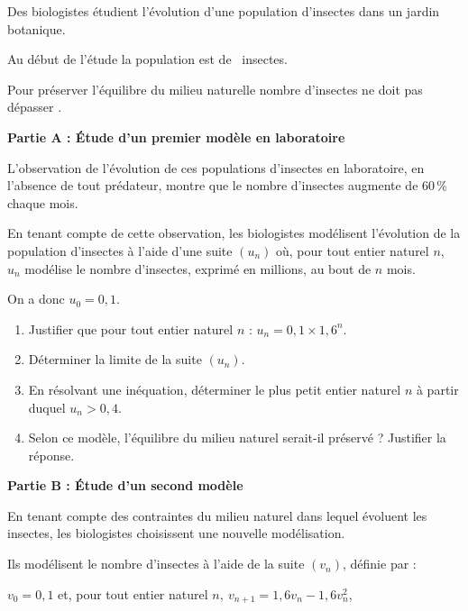 \medskip

Des biologistes étudient l'évolution d'une population d'insectes dans un jardin botanique. 

Au début de l'étude la population est de ~insectes.

Pour préserver l'équilibre du milieu naturelle nombre d'insectes ne doit pas dépasser .

\bigskip

\textbf{Partie A : Étude d'un premier modèle en laboratoire}

\medskip

L'observation de l'évolution de ces populations d'insectes en laboratoire, en l'absence de tout prédateur, montre que le nombre d'insectes augmente de 60\,\% chaque mois.

En tenant compte de cette observation, les biologistes modélisent l'évolution de la population d'insectes à l'aide d'une suite $\left(u_n\right)$ où, pour tout entier naturel $n$, \: $u_n$ modélise le nombre d'insectes, exprimé en millions, au bout de $n$ mois. 

On a donc $u_0 = 0,1$.

\medskip

\begin{enumerate}
\item Justifier que pour tout entier naturel $n$ : \:$u_n = 0,1 \times 1,6^n$.
\item Déterminer la limite de la suite $\left(u_n\right)$.
\item En résolvant une inéquation, déterminer le plus petit entier naturel $n$ à partir duquel $u_n > 0,4$.
\item Selon ce modèle, l'équilibre du milieu naturel serait-il préservé ? Justifier la réponse.
\end{enumerate}

\bigskip

\textbf{Partie B : Étude d'un second modèle}

\medskip

En tenant compte des contraintes du milieu naturel dans lequel évoluent les insectes, les biologistes choisissent une nouvelle modélisation.

Ils modélisent le nombre d'insectes à l'aide de la suite $\left(v_n\right)$, définie par :

\begin{center}$v_0 = 0,1$ \quad et, pour tout entier naturel $n,\: v_{n+1} = 1,6v_n - 1,6v_n^2$,\end{center}


